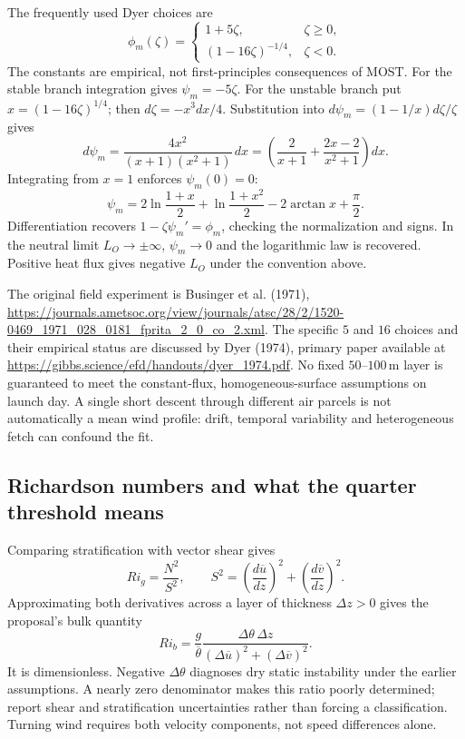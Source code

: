 The frequently used Dyer choices are
\begin{equation}
 \phi_m(\zeta)=
 \begin{cases}
  1+5\zeta,&\zeta\geq0,\\
  (1-16\zeta)^{-1/4},&\zeta<0.
 \end{cases}
\end{equation}
The constants are empirical, not first-principles consequences of MOST.
For the stable branch integration gives $\psi_m=-5\zeta$.
For the unstable branch put $x=(1-16\zeta)^{1/4}$; then
$d\zeta=-x^3dx/4$. Substitution into $d\psi_m=(1-1/x)d\zeta/\zeta$
gives
\begin{equation}
 d\psi_m=\frac{4x^2}{(x+1)(x^2+1)}\,dx
 =\left(\frac{2}{x+1}+\frac{2x-2}{x^2+1}\right)dx.
\end{equation}
Integrating from $x=1$ enforces $\psi_m(0)=0$:
\begin{equation}
 \psi_m=2\ln\frac{1+x}{2}+\ln\frac{1+x^2}{2}
        -2\arctan x+\frac\pi2.
\end{equation}
Differentiation recovers $1-\zeta\psi_m'=\phi_m$, checking the
normalization and signs. In the neutral limit $L_O\to\pm\infty$,
$\psi_m\to0$ and the logarithmic law is recovered. Positive heat flux
gives negative $L_O$ under the convention above.

The original field experiment is Businger et al. (1971),
\url{https://journals.ametsoc.org/view/journals/atsc/28/2/1520-0469_1971_028_0181_fprita_2_0_co_2.xml}.
The specific $5$ and $16$ choices and their empirical status are discussed
by Dyer (1974), primary paper available at
\url{https://gibbs.science/efd/handouts/dyer_1974.pdf}.
No fixed $50$--$100\,\mathrm m$ layer is guaranteed to meet the
constant-flux, homogeneous-surface assumptions on launch day. A single
short descent through different air parcels is not automatically a mean
wind profile: drift, temporal variability and heterogeneous fetch can
confound the fit.

\subsection{Richardson numbers and what the quarter threshold means}

Comparing stratification with vector shear gives
\begin{equation}
 Ri_g=\frac{N^2}{S^2},\qquad
 S^2=\left(\frac{d\overline u}{dz}\right)^2
       +\left(\frac{d\overline v}{dz}\right)^2.
\end{equation}
Approximating both derivatives across a layer of thickness $\Delta z>0$
gives the proposal's bulk quantity
\begin{equation}
 Ri_b=\frac{g}{\overline\theta}
 \frac{\Delta\theta\,\Delta z}
      {(\Delta\overline u)^2+(\Delta\overline v)^2}.
\end{equation}
It is dimensionless. Negative $\Delta\theta$ diagnoses dry static
instability under the earlier assumptions. A nearly zero denominator
makes this ratio poorly determined; report shear and stratification
uncertainties rather than forcing a classification. Turning wind requires
both velocity components, not speed differences alone.

